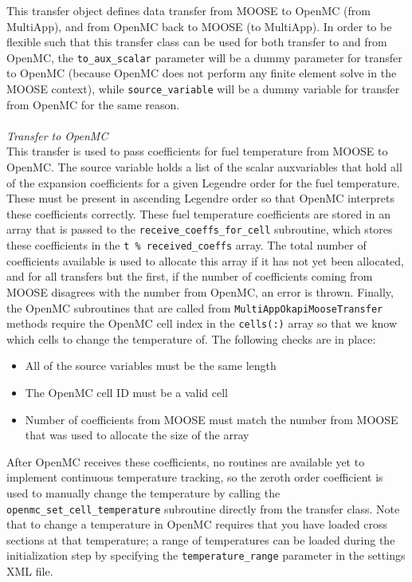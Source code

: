 \documentclass[10pt]{article}
\newcounter{subsubsubsection}[subsubsection]
\numberwithin{equation}{section} %
\begin{document}
This transfer object defines data transfer from MOOSE to OpenMC (from MultiApp), and from OpenMC back to MOOSE (to MultiApp). In order to be flexible such that this transfer class can be used for both transfer to and from OpenMC, the {\tt to\_aux\_scalar} parameter will be a dummy parameter for transfer to OpenMC (because OpenMC does not perform any finite element solve in the MOOSE context), while {\tt source\_variable} will be a dummy variable for transfer from OpenMC for the same reason.
\\\\
{\it Transfer to OpenMC}\\
This transfer is used to pass coefficients for fuel temperature from MOOSE to OpenMC. The source variable holds a list of the scalar auxvariables that hold all of the expansion coefficients for a given Legendre order for the fuel temperature. These must be present in ascending Legendre order so that OpenMC interprets these coefficients correctly. These fuel temperature coefficients are stored in an array that is passed to the {\tt receive\_coeffs\_for\_cell} subroutine, which stores these coefficients in the {\tt t \% received\_coeffs} array. The total number of coefficients available is used to allocate this array if it has not yet been allocated, and for all transfers but the first, if the number of coefficients coming from MOOSE disagrees with the number from OpenMC, an error is thrown. Finally, the OpenMC subroutines that are called from {\tt MultiAppOkapiMooseTransfer} methods require the OpenMC cell index in the {\tt cells(:)} array so that we know which cells to change the temperature of. The following checks are in place:

\begin{itemize}
\item All of the source variables must be the same length
\item The OpenMC cell ID must be a valid cell
\item Number of coefficients from MOOSE must match the number from MOOSE that was used to allocate the size of the array
\end{itemize}

After OpenMC receives these coefficients, no routines are available yet to implement continuous temperature tracking, so the zeroth order coefficient is used to manually change the temperature by calling the {\tt openmc\_set\_cell\_temperature} subroutine directly from the transfer class. Note that to change a temperature in OpenMC requires that you have loaded cross sections at that temperature; a range of temperatures can be loaded during the initialization step by specifying the {\tt temperature\_range} parameter in the settings XML file.
\end{document}
